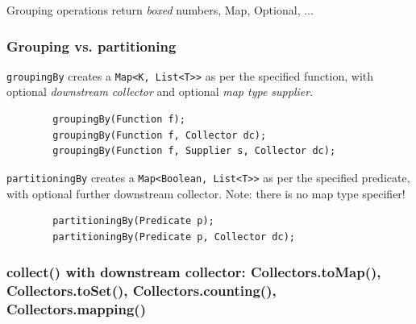 \documentclass{scrartcl}
\begin{document}
    Grouping operations return \textit{boxed} numbers, Map, Optional, ...

\subsubsection{Grouping vs. partitioning}

    \lstinline{groupingBy} creates a \lstinline{Map<K, List<T>>} as per the specified function, with optional \textit{downstream collector} and optional \textit{map type supplier}.

    \begin{lstlisting}
        groupingBy(Function f);
        groupingBy(Function f, Collector dc);
        groupingBy(Function f, Supplier s, Collector dc);
    \end{lstlisting}

    \lstinline{partitioningBy} creates a \lstinline{Map<Boolean, List<T>>} as per the specified predicate, with optional further downstream collector.
    Note: there is no map type specifier!

    \begin{lstlisting}
        partitioningBy(Predicate p);
        partitioningBy(Predicate p, Collector dc);
    \end{lstlisting}

\subsubsection{collect() with downstream collector: Collectors.toMap(), Collectors.toSet(), Collectors.counting(), Collectors.mapping()}
\end{document}
